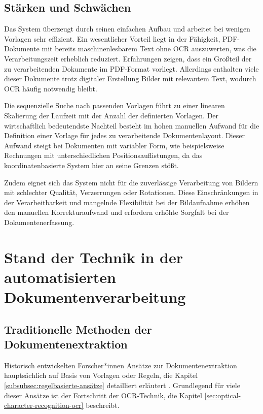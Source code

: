 \subsection{Stärken und Schwächen}
\label{subsec:stärken-und-schwächen}

Das System überzeugt durch seinen einfachen Aufbau und arbeitet bei wenigen Vorlagen sehr effizient. Ein wesentlicher Vorteil liegt in der Fähigkeit, PDF-Dokumente mit bereits maschinenlesbarem Text ohne \gls{OCR} auszuwerten, was die Verarbeitungszeit erheblich reduziert. Erfahrungen zeigen, dass ein Großteil der zu verarbeitenden Dokumente im PDF-Format vorliegt. Allerdings enthalten viele dieser Dokumente trotz digitaler Erstellung Bilder mit relevantem Text, wodurch \gls{OCR} häufig notwendig bleibt.

Die sequenzielle Suche nach passenden Vorlagen führt zu einer linearen Skalierung der Laufzeit mit der Anzahl der definierten Vorlagen. Der wirtschaftlich bedeutendste Nachteil besteht im hohen manuellen Aufwand für die Definition einer Vorlage für jedes zu verarbeitende Dokumentenlayout. Dieser Aufwand steigt bei Dokumenten mit variabler Form, wie beispielsweise Rechnungen mit unterschiedlichen Positionsauflistungen, da das koordinatenbasierte System hier an seine Grenzen stößt.

Zudem eignet sich das System nicht für die zuverlässige Verarbeitung von Bildern mit schlechter Qualität, Verzerrungen oder Rotationen. Diese Einschränkungen in der Verarbeitbarkeit und mangelnde Flexibilität bei der Bildaufnahme erhöhen den manuellen Korrekturaufwand und erfordern erhöhte Sorgfalt bei der Dokumentenerfassung.

\section{Stand der Technik in der automatisierten Dokumentenverarbeitung}
\label{sec:stand-der-technik-in-der-automatisierten-dokumentenverarbeitung}

\subsection{Traditionelle Methoden der Dokumentenextraktion}
\label{subsec:traditionelle-Methoden-der-Dokumentenverarbeitung}

Historisch entwickelten Forscher*innen Ansätze zur Dokumentenextraktion hauptsächlich auf Basis von Vorlagen oder Regeln, die Kapitel \ref{subsubsec:regelbasierte-ansätze} detailliert erläutert \parencite{YeYibin2018Auso, ChowdhuryGobindaG.1999Tmfi}. Grundlegend für viele dieser Ansätze ist der Fortschritt der \gls{OCR}-Technik, die Kapitel \ref{sec:optical-character-recognition-ocr} beschreibt.

